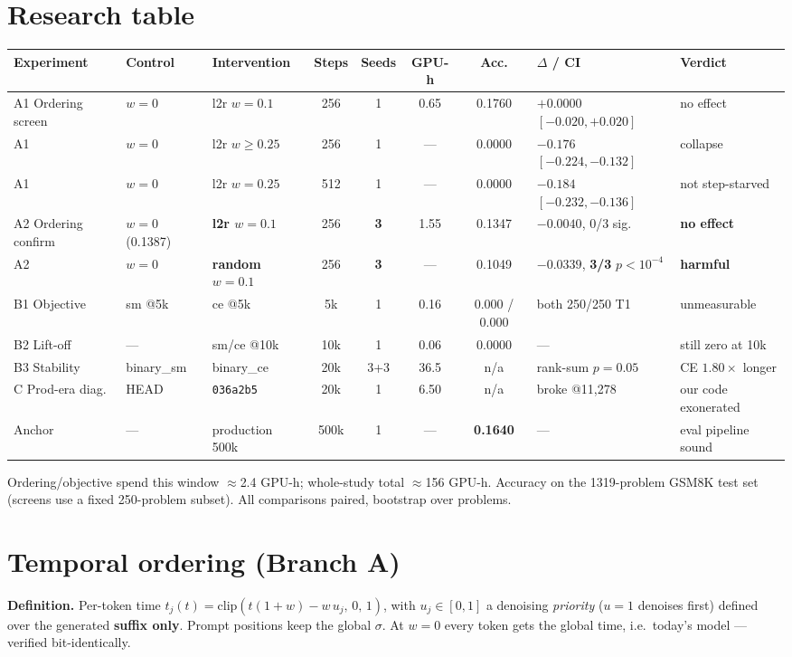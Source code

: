 \documentclass[10pt,a4paper]{article}
\newcommand{\code}[1]{\texttt{\small #1}}
\newcommand{\neg}[1]{\textcolor{red!70!black}{#1}}
\begin{document}
\section{Research table}
\begin{center}\small
\begin{tabular}{@{}p{2.5cm}p{1.9cm}p{2.1cm}ccccp{2.4cm}p{2.3cm}@{}}
\toprule
\textbf{Experiment} & \textbf{Control} & \textbf{Intervention} & \textbf{Steps} &
\textbf{Seeds} & \textbf{GPU-h} & \textbf{Acc.} & \textbf{$\Delta$ / CI} &
\textbf{Verdict}\\
\midrule
A1 Ordering screen & $w{=}0$ & l2r $w{=}0.1$ & 256 & 1 & 0.65 & 0.1760 &
$+0.0000$ $[-0.020,+0.020]$ & no effect\\
A1 & $w{=}0$ & l2r $w{\geq}0.25$ & 256 & 1 & --- & 0.0000 &
$-0.176$ $[-0.224,-0.132]$ & \neg{collapse}\\
A1 & $w{=}0$ & l2r $w{=}0.25$ & 512 & 1 & --- & 0.0000 &
$-0.184$ $[-0.232,-0.136]$ & \neg{not step-starved}\\
A2 Ordering confirm & $w{=}0$ (0.1387) & \textbf{l2r $w{=}0.1$} & 256 & \textbf{3} &
1.55 & 0.1347 & $-0.0040$, 0/3 sig. & \textbf{no effect}\\
A2 & $w{=}0$ & \textbf{random $w{=}0.1$} & 256 & \textbf{3} & --- & 0.1049 &
$-0.0339$, \textbf{3/3} $p{<}10^{-4}$ & \neg{\textbf{harmful}}\\
B1 Objective & sm @5k & ce @5k & 5k & 1 & 0.16 & 0.000 / 0.000 &
both 250/250 T1 & \neg{unmeasurable}\\
B2 Lift-off & --- & sm/ce @10k & 10k & 1 & 0.06 & 0.0000 & --- &
still zero at 10k\\
B3 Stability & binary\_sm & binary\_ce & 20k & 3+3 & 36.5 & n/a &
rank-sum $p{=}0.05$ & CE $1.80\times$ longer\\
C Prod-era diag. & HEAD & \code{036a2b5} & 20k & 1 & 6.50 & n/a &
broke @11{,}278 & our code exonerated\\
Anchor & --- & production 500k & 500k & 1 & --- & \textbf{0.1640} & --- &
eval pipeline sound\\
\bottomrule
\end{tabular}
\end{center}
\noindent\footnotesize Ordering/objective spend this window $\approx$2.4 GPU-h;
whole-study total $\approx$156 GPU-h. Accuracy on the 1319-problem GSM8K test
set (screens use a fixed 250-problem subset). All comparisons paired, bootstrap
over problems.\normalsize

\section{Temporal ordering (Branch A)}
\textbf{Definition.} Per-token time
$t_j(t)=\mathrm{clip}\!\left(t(1+w)-w\,u_j,\,0,\,1\right)$, with $u_j\in[0,1]$ a
denoising \emph{priority} ($u{=}1$ denoises first) defined over the generated
\textbf{suffix only}. Prompt positions keep the global $\sigma$. At $w{=}0$ every
token gets the global time, i.e.\ today's model --- verified bit-identically.
\end{document}

